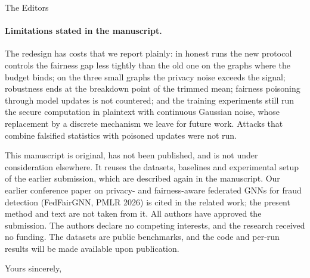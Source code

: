 \documentclass[11pt]{letter}
\begin{document}
\begin{letter}{The Editors}
\paragraph{Limitations stated in the manuscript.} The redesign has costs that we report plainly: in honest runs the new protocol controls the fairness gap less tightly than the old one on the graphs where the budget binds; on the three small graphs the privacy noise exceeds the signal; robustness ends at the breakdown point of the trimmed mean; fairness poisoning through model updates is not countered; and the training experiments still run the secure computation in plaintext with continuous Gaussian noise, whose replacement by a discrete mechanism we leave for future work. Attacks that combine falsified statistics with poisoned updates were not run.

This manuscript is original, has not been published, and is not under consideration elsewhere. It reuses the datasets, baselines and experimental setup of the earlier submission, which are described again in the manuscript. Our earlier conference paper on privacy- and fairness-aware federated GNNs for fraud detection (FedFairGNN, PMLR 2026) is cited in the related work; the present method and text are not taken from it. All authors have approved the submission. The authors declare no competing interests, and the research received no funding. The datasets are public benchmarks, and the code and per-run results will be made available upon publication.

\closing{Yours sincerely,}

\end{letter}
\end{document}
